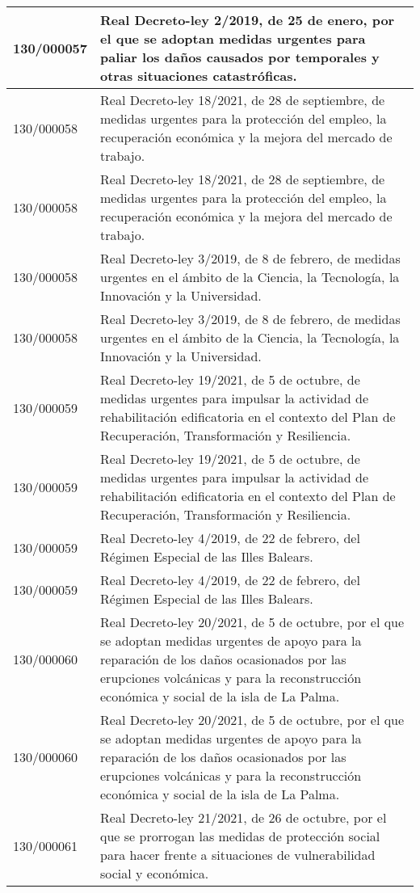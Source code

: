 {\begin{table}[H]
\begin{center}
\begin{tabularx}{\linewidth}{| l | X |}
\hline
130/000057 & Real Decreto-ley 2/2019, de 25 de enero, por el que se adoptan medidas urgentes para paliar los daños causados por temporales y otras situaciones catastróficas. \\
\hline
130/000058 & Real Decreto-ley 18/2021, de 28 de septiembre, de medidas urgentes para la protección del empleo, la recuperación económica y la mejora del mercado de trabajo. \\
\hline
130/000058 & Real Decreto-ley 18/2021, de 28 de septiembre, de medidas urgentes para la protección del empleo, la recuperación económica y la mejora del mercado de trabajo. \\
\hline
130/000058 & Real Decreto-ley 3/2019, de 8 de febrero, de medidas urgentes en el ámbito de la Ciencia, la Tecnología, la Innovación y la Universidad. \\
\hline
130/000058 & Real Decreto-ley 3/2019, de 8 de febrero, de medidas urgentes en el ámbito de la Ciencia, la Tecnología, la Innovación y la Universidad. \\
\hline
130/000059 & Real Decreto-ley 19/2021, de 5 de octubre, de medidas urgentes para impulsar la actividad de rehabilitación edificatoria en el contexto del Plan de Recuperación, Transformación y Resiliencia. \\
\hline
130/000059 & Real Decreto-ley 19/2021, de 5 de octubre, de medidas urgentes para impulsar la actividad de rehabilitación edificatoria en el contexto del Plan de Recuperación, Transformación y Resiliencia. \\
\hline
130/000059 & Real Decreto-ley 4/2019, de 22 de febrero, del Régimen Especial de las Illes Balears. \\
\hline
130/000059 & Real Decreto-ley 4/2019, de 22 de febrero, del Régimen Especial de las Illes Balears. \\
\hline
130/000060 & Real Decreto-ley 20/2021, de 5 de octubre, por el que se adoptan medidas urgentes de apoyo para la reparación de los daños ocasionados por las erupciones volcánicas y para la reconstrucción económica y social de la isla de La Palma. \\
\hline
130/000060 & Real Decreto-ley 20/2021, de 5 de octubre, por el que se adoptan medidas urgentes de apoyo para la reparación de los daños ocasionados por las erupciones volcánicas y para la reconstrucción económica y social de la isla de La Palma. \\
\hline
130/000061 & Real Decreto-ley 21/2021, de 26 de octubre, por el que se prorrogan las medidas de protección social para hacer frente a situaciones de vulnerabilidad social y económica. \\

\end{tabularx}
\end{center}
\end{table}}
